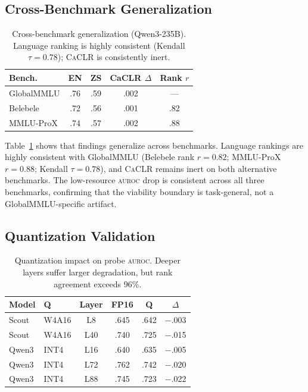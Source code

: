 \documentclass[11pt,a4paper]{article}
\newcommand{\auroc}{\textsc{auroc}}
\newcommand{\caclr}{\textsc{CaCLR}}
\begin{document}
\subsection{Cross-Benchmark Generalization}
\label{sec:generalization}

\begin{table}[t]
\centering
\small
\begin{tabular}{lcccc}
\toprule
\textbf{Bench.} & \textbf{EN} & \textbf{ZS} & \textbf{CaCLR $\Delta$} & \textbf{Rank $r$} \\
\midrule
GlobalMMLU & .76 & .59 & .002 & --- \\
Belebele & .72 & .56 & .001 & .82 \\
MMLU-ProX & .74 & .57 & .002 & .88 \\
\bottomrule
\end{tabular}
\caption{Cross-benchmark generalization (Qwen3-235B). Language ranking is highly consistent (Kendall $\tau{=}0.78$); \caclr{} is consistently inert.}
\label{tab:generalization}
\end{table}

Table~\ref{tab:generalization} shows that findings generalize across benchmarks.
Language rankings are highly consistent with GlobalMMLU (Belebele rank $r{=}0.82$; MMLU-ProX $r{=}0.88$; Kendall $\tau{=}0.78$), and \caclr{} remains inert on both alternative benchmarks.
The low-resource \auroc{} drop is consistent across all three benchmarks, confirming that the viability boundary is task-general, not a GlobalMMLU-specific artifact.

\subsection{Quantization Validation}
\label{sec:quant}

\begin{table}[t]
\centering
\small
\begin{tabular}{llcccc}
\toprule
\textbf{Model} & \textbf{Q} & \textbf{Layer} & \textbf{FP16} & \textbf{Q} & $\Delta$ \\
\midrule
Scout & W4A16 & L8 & .645 & .642 & $-$.003 \\
Scout & W4A16 & L40 & .740 & .725 & $-$.015 \\
Qwen3 & INT4 & L16 & .640 & .635 & $-$.005 \\
Qwen3 & INT4 & L72 & .762 & .742 & $-$.020 \\
Qwen3 & INT4 & L88 & .745 & .723 & $-$.022 \\
\bottomrule
\end{tabular}
\caption{Quantization impact on probe \auroc{}. Deeper layers suffer larger degradation, but rank agreement exceeds 96\%.}
\label{tab:quant}
\end{table}
\end{document}
